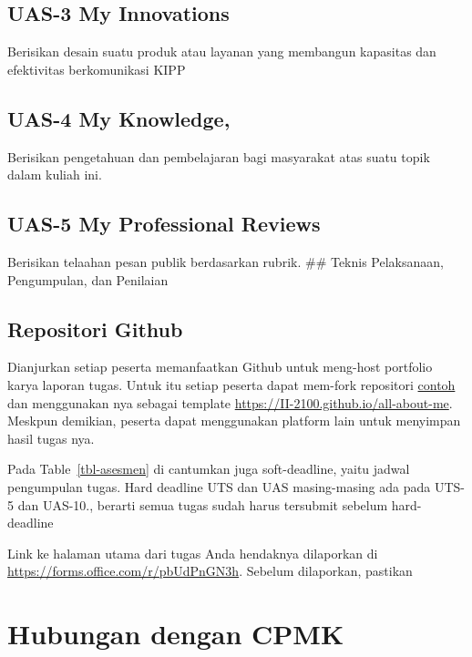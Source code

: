 \documentclass[
  letterpaper,
  DIV=11,
  numbers=noendperiod]{scrreprt}
\begin{document}
\subsection*{UAS-3 My Innovations}\label{uas-3-my-innovations}

Berisikan desain suatu produk atau layanan yang membangun kapasitas dan
efektivitas berkomunikasi KIPP

\subsection*{UAS-4 My Knowledge,}\label{uas-4-my-knowledge}

Berisikan pengetahuan dan pembelajaran bagi masyarakat atas suatu topik
dalam kuliah ini.

\subsection*{UAS-5 My Professional
Reviews}\label{uas-5-my-professional-reviews}

Berisikan telaahan pesan publik berdasarkan rubrik. \#\# Teknis
Pelaksanaan, Pengumpulan, dan Penilaian

\subsection*{Repositori Github}\label{repositori-github}

Dianjurkan setiap peserta memanfaatkan Github untuk meng-host portfolio
karya laporan tugas. Untuk itu setiap peserta dapat mem-fork repositori
\href{https://github.com/II-2100/all-about-me}{contoh} dan menggunakan
nya sebagai template \url{https://II-2100.github.io/all-about-me}.
Meskpun demikian, peserta dapat menggunakan platform lain untuk
menyimpan hasil tugas nya.

Pada Table~\ref{tbl-asesmen} di cantumkan juga soft-deadline, yaitu
jadwal pengumpulan tugas. Hard deadline UTS dan UAS masing-masing ada
pada UTS-5 dan UAS-10., berarti semua tugas sudah harus tersubmit
sebelum hard-deadline

Link ke halaman utama dari tugas Anda hendaknya dilaporkan di
\url{https://forms.office.com/r/pbUdPnGN3h}. Sebelum dilaporkan,
pastikan

\section*{Hubungan dengan CPMK}\label{hubungan-dengan-cpmk}
\end{document}
